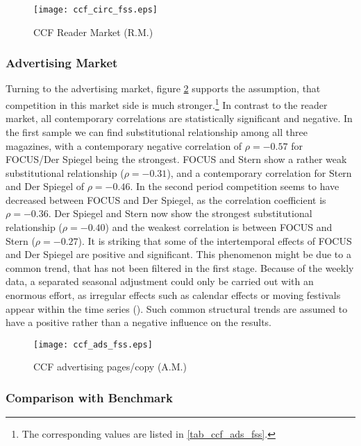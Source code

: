 \documentclass[12pt,a4paper,notitlepage]{article}
\begin{document}
\begin{figure}[H]
\caption{CCF Reader Market (R.M.)}
	\centering
	\texttt{[image: ccf\_circ\_fss.eps]}
\label{fig_ccf_circ_fss}
\end{figure}




\subsubsection{Advertising Market}
Turning to the advertising market, figure \ref{fig_ccf_ads_fss} supports the assumption, that competition in this market side is much stronger.\footnote{The corresponding values are listed in \ref{tab_ccf_ads_fss}.} In contrast to the reader market, all contemporary correlations are statistically significant and negative. In the first sample we can find substitutional relationship among all three magazines, with a contemporary negative correlation of $\rho=-0.57$ for FOCUS/Der Spiegel being the strongest. FOCUS and Stern show a rather weak substitutional relationship ($\rho=-0.31$), and a contemporary correlation for Stern and Der Spiegel of $\rho=-0.46$. In the second period competition seems to have decreased between FOCUS and Der Spiegel, as the correlation coefficient is $\rho=-0.36$. Der Spiegel and Stern now show the strongest substitutional relationship ($\rho=-0.40$) and the weakest correlation is between FOCUS and Stern ($\rho=-0.27$). It is striking that some of the intertemporal effects of FOCUS and Der Spiegel are positive and significant. This phenomenon might be due to a common trend, that has not been filtered in the first stage. Because of the weekly data, a separated seasonal adjustment could only be carried out with an enormous effort, as irregular effects such as calendar effects or moving festivals appear within the time series (\cite{harvey_modeling_1997}). Such common structural trends are assumed to have a positive rather than a negative influence on the results. 

\begin{figure}[H]
\caption{CCF advertising pages/copy (A.M.)}
	\centering
	\texttt{[image: ccf\_ads\_fss.eps]}
	\label{fig_ccf_ads_fss}
\end{figure}



\subsubsection{Comparison with Benchmark}
\end{document}
